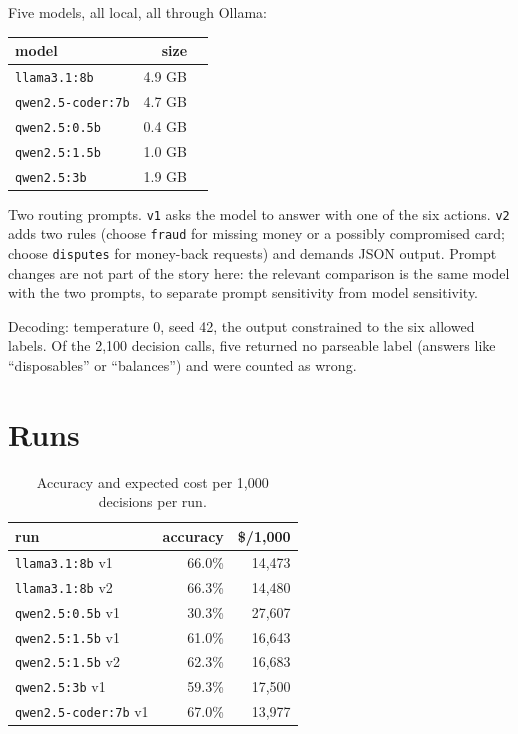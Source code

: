 \documentclass[11pt]{article}
\begin{document}
Five models, all local, all through Ollama:

\begin{tabular}{lrr}
model & size \\
\hline
\texttt{llama3.1:8b} & 4.9 GB \\
\texttt{qwen2.5-coder:7b} & 4.7 GB \\
\texttt{qwen2.5:0.5b} & 0.4 GB \\
\texttt{qwen2.5:1.5b} & 1.0 GB \\
\texttt{qwen2.5:3b} & 1.9 GB \\
\end{tabular}

Two routing prompts. \texttt{v1} asks the model to answer with one of the six
actions. \texttt{v2} adds two rules (choose \texttt{fraud} for missing money
or a possibly compromised card; choose \texttt{disputes} for money-back
requests) and demands JSON output. Prompt changes are not part of
the story here: the relevant comparison is the same model with the two
prompts, to separate prompt sensitivity from model sensitivity.

Decoding: temperature 0, seed 42, the output constrained to the six allowed
labels. Of the 2,100 decision calls, five returned no parseable label
(answers like ``disposables'' or ``balances'') and were counted as wrong.

\section{Runs}

\begin{table}[h]
\centering
\begin{tabular}{lrr}
\toprule
run & accuracy & \$/1,000 \\
\midrule
\texttt{llama3.1:8b} v1 & 66.0\% & 14,473 \\
\texttt{llama3.1:8b} v2 & 66.3\% & 14,480 \\
\texttt{qwen2.5:0.5b} v1 & 30.3\% & 27,607 \\
\texttt{qwen2.5:1.5b} v1 & 61.0\% & 16,643 \\
\texttt{qwen2.5:1.5b} v2 & 62.3\% & 16,683 \\
\texttt{qwen2.5:3b} v1 & 59.3\% & 17,500 \\
\texttt{qwen2.5-coder:7b} v1 & 67.0\% & 13,977 \\
\bottomrule
\end{tabular}
\caption{Accuracy and expected cost per 1,000 decisions per run.}
\end{table}
\end{document}
